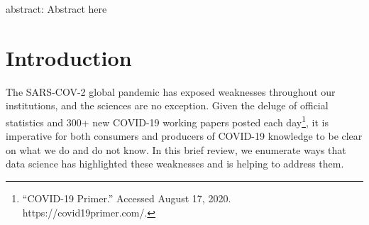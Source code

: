 \documentclass[10pt,letterpaper]{article}
\newcommand{\getIndex}[2]{
  \ForEach{,}{\IfEq{#1}{\thislevelitem}{\number\thislevelcount\ExitForEach}{}}{#2}
}
\newcommand{\getAff}[1]{
  \getIndex{#1}{University of California San Diego}
}
\begin{document}
\vspace*{0.2in}



\linenumbers

abstract: Abstract here

\hypertarget{introduction}{%
\section{Introduction}\label{introduction}}

The SARS-COV-2 global pandemic has exposed weaknesses throughout our
institutions, and the sciences are no exception. Given the deluge of
official statistics and 300+ new COVID-19 working papers posted each
day\footnote{``COVID-19 Primer.'' Accessed August 17, 2020.
  https://covid19primer.com/.}, it is imperative for both consumers and
producers of COVID-19 knowledge to be clear on what we do and do not
know. In this brief review, we enumerate ways that data science has
highlighted these weaknesses and is helping to address them.
\end{document}
